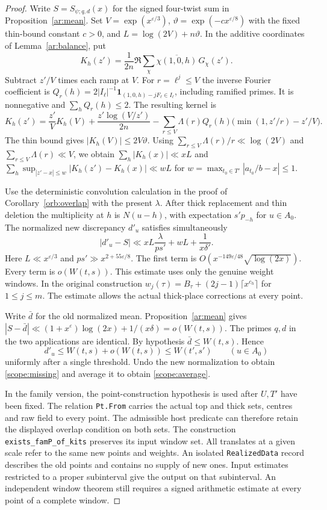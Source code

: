 \begin{proof}
Write \(S=S_{\psi;q,d}(x)\) for the signed four-twist sum in
Proposition~\ref{ar:mean}. Set \(V=\exp(x^{\varepsilon/3})\),
\(\vartheta=\exp(-c x^{\varepsilon/8})\) with the fixed thin-bound
constant \(c>0\), and \(L=\log(2V)+n\vartheta\). In the additive
coordinates of Lemma~\ref{ar:balance}, put
\[
 K_h(z')=\frac{1}{2n}\Re\sum_{\chi}
                  \overline{\chi(1,0,h)}\,G_\chi(z').
\]
Subtract \(z'/V\) times each ramp at \(V\). For \(r=\ell^j\le V\)
the inverse Fourier coefficient is
\(Q_r(h)=2|I_\ell|^{-1}
\mathbf1_{(1,0,h)-jF_\ell\in I_\ell}\), including ramified primes.
It is nonnegative and \(\sum_h Q_r(h)\le2\). The resulting kernel is
\[
 K_h(z')=\frac{z'}{V}K_h(V)+\frac{z'\log(V/z')}{2n}
 -\sum_{r\le V}\Lambda(r)Q_r(h)\bigl(\min(1,z'/r)-z'/V\bigr).
\]
The thin bound gives \(|K_h(V)|\le2V\vartheta\).
Using \(\sum_{r\le V}\Lambda(r)/r\ll\log(2V)\) and
\(\sum_{r\le V}\Lambda(r)\ll V\), we obtain
\(\sum_h|K_h(x)|\ll xL\) and
\(\sum_h\sup_{|z'-x|\le w}|K_h(z')-K_h(x)|\ll wL\)
for \(w=\max_{t_0\in T'}|a_{t_0}/b-x|\le1\).

Use the deterministic convolution calculation in the proof of
Corollary~\ref{orb:overlap} with the present \(\lambda\). After
thick replacement and thin deletion the multiplicity at \(h\) is
\(N(u-h)\), with expectation \(s'p_{-h}\) for \(u\in A_0\).
The normalized new discrepancy \(d'_u\) satisfies simultaneously
\[
 |d'_u-S|\ll
      xL\frac{\lambda}{ps'}+wL+\frac1{x\delta'} .
\]
Here \(L\ll x^{\varepsilon/3}\) and \(ps'\gg x^{2+55\varepsilon/8}\).
The first term is \(O(x^{-149\varepsilon/48}\sqrt{\log(2x)})\).
Every term is \(o(W(t,s))\). This estimate uses only the genuine
weight windows. In the original construction
\(w_j(\tau)=B_\tau+(2j-1)\lceil x^{c_h}\rceil\) for \(1\le j\le m\).
The estimate allows the actual thick-place corrections at every point.

Write \(\bar d\) for the old normalized mean. Proposition~\ref{ar:mean}
gives \(|S-\bar d|\ll(1+x^\varepsilon)\log(2x)+1/(x\delta)
=o(W(t,s))\). The primes \(q,d\) in the two applications are identical.
By hypothesis \(\bar d\le W(t,s)\). Hence
\[
       d'_u\le W(t,s)+o(W(t,s))\le W(t',s')\qquad(u\in A_0)
\]
uniformly after a single threshold. Undo the new normalization to
obtain \eqref{scope:missing} and average it to obtain \eqref{scope:average}.

In the family version, the point-construction hypothesis is used after
\(U,T'\) have been fixed. The relation \texttt{Pt.From} carries the
actual top and thick sets, centres and raw field to every point.
The admissible host predicate can therefore retain the displayed
overlap condition on both sets. The construction
\texttt{exists\_famP\_of\_kits} preserves its input window set.
All translates at a given scale refer to the same new points and weights.
An isolated \texttt{RealizedData} record describes the old points and
contains no supply of new ones. Input estimates restricted to a proper
subinterval give the output on that subinterval. An independent window
theorem still requires a signed arithmetic estimate at every point
of a complete window.
\end{proof}


